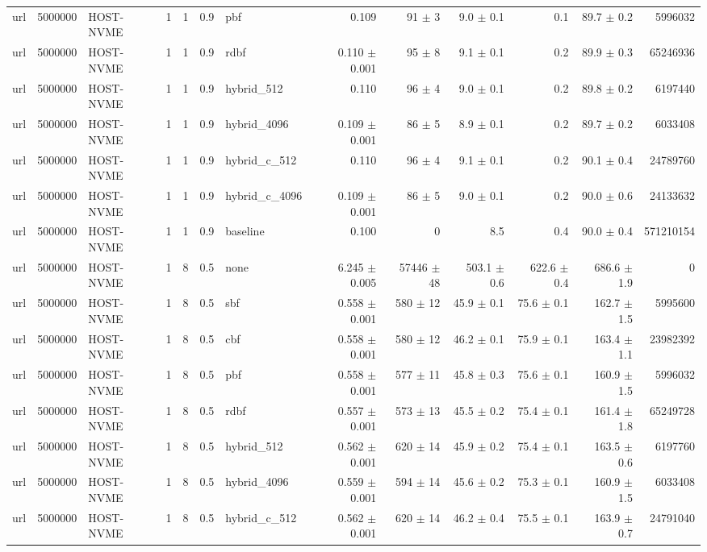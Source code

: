 \begin{tabular}{lllllllrrrrrr}
url & 5000000 & HOST-NVME & 1 & 1 & 0.9 & pbf & 0.109 & 91 $\pm$ 3 & 9.0 $\pm$ 0.1 & 0.1 & 89.7 $\pm$ 0.2 & 5996032 \\
url & 5000000 & HOST-NVME & 1 & 1 & 0.9 & rdbf & 0.110 $\pm$ 0.001 & 95 $\pm$ 8 & 9.1 $\pm$ 0.1 & 0.2 & 89.9 $\pm$ 0.3 & 65246936 \\
url & 5000000 & HOST-NVME & 1 & 1 & 0.9 & hybrid\_512 & 0.110 & 96 $\pm$ 4 & 9.0 $\pm$ 0.1 & 0.2 & 89.8 $\pm$ 0.2 & 6197440 \\
url & 5000000 & HOST-NVME & 1 & 1 & 0.9 & hybrid\_4096 & 0.109 $\pm$ 0.001 & 86 $\pm$ 5 & 8.9 $\pm$ 0.1 & 0.2 & 89.7 $\pm$ 0.2 & 6033408 \\
url & 5000000 & HOST-NVME & 1 & 1 & 0.9 & hybrid\_c\_512 & 0.110 & 96 $\pm$ 4 & 9.1 $\pm$ 0.1 & 0.2 & 90.1 $\pm$ 0.4 & 24789760 \\
url & 5000000 & HOST-NVME & 1 & 1 & 0.9 & hybrid\_c\_4096 & 0.109 $\pm$ 0.001 & 86 $\pm$ 5 & 9.0 $\pm$ 0.1 & 0.2 & 90.0 $\pm$ 0.6 & 24133632 \\
url & 5000000 & HOST-NVME & 1 & 1 & 0.9 & baseline & 0.100 & 0 & 8.5 & 0.4 & 90.0 $\pm$ 0.4 & 571210154 \\
url & 5000000 & HOST-NVME & 1 & 8 & 0.5 & none & 6.245 $\pm$ 0.005 & 57446 $\pm$ 48 & 503.1 $\pm$ 0.6 & 622.6 $\pm$ 0.4 & 686.6 $\pm$ 1.9 & 0 \\
url & 5000000 & HOST-NVME & 1 & 8 & 0.5 & sbf & 0.558 $\pm$ 0.001 & 580 $\pm$ 12 & 45.9 $\pm$ 0.1 & 75.6 $\pm$ 0.1 & 162.7 $\pm$ 1.5 & 5995600 \\
url & 5000000 & HOST-NVME & 1 & 8 & 0.5 & cbf & 0.558 $\pm$ 0.001 & 580 $\pm$ 12 & 46.2 $\pm$ 0.1 & 75.9 $\pm$ 0.1 & 163.4 $\pm$ 1.1 & 23982392 \\
url & 5000000 & HOST-NVME & 1 & 8 & 0.5 & pbf & 0.558 $\pm$ 0.001 & 577 $\pm$ 11 & 45.8 $\pm$ 0.3 & 75.6 $\pm$ 0.1 & 160.9 $\pm$ 1.5 & 5996032 \\
url & 5000000 & HOST-NVME & 1 & 8 & 0.5 & rdbf & 0.557 $\pm$ 0.001 & 573 $\pm$ 13 & 45.5 $\pm$ 0.2 & 75.4 $\pm$ 0.1 & 161.4 $\pm$ 1.8 & 65249728 \\
url & 5000000 & HOST-NVME & 1 & 8 & 0.5 & hybrid\_512 & 0.562 $\pm$ 0.001 & 620 $\pm$ 14 & 45.9 $\pm$ 0.2 & 75.4 $\pm$ 0.1 & 163.5 $\pm$ 0.6 & 6197760 \\
url & 5000000 & HOST-NVME & 1 & 8 & 0.5 & hybrid\_4096 & 0.559 $\pm$ 0.001 & 594 $\pm$ 14 & 45.6 $\pm$ 0.2 & 75.3 $\pm$ 0.1 & 160.9 $\pm$ 1.5 & 6033408 \\
url & 5000000 & HOST-NVME & 1 & 8 & 0.5 & hybrid\_c\_512 & 0.562 $\pm$ 0.001 & 620 $\pm$ 14 & 46.2 $\pm$ 0.4 & 75.5 $\pm$ 0.1 & 163.9 $\pm$ 0.7 & 24791040 \\

\end{tabular}
